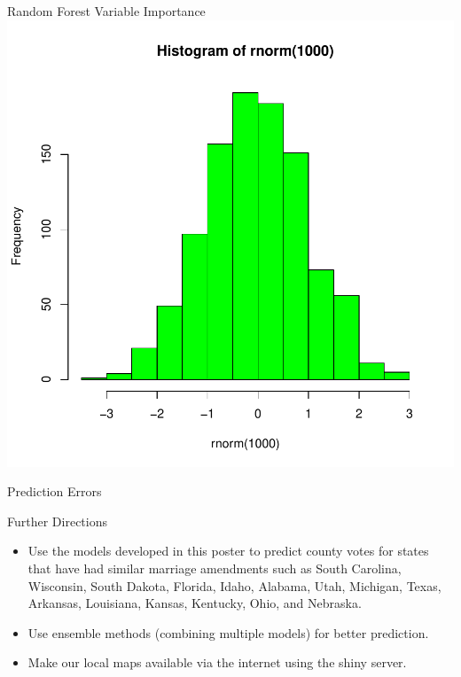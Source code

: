 \documentclass[final]{beamer}
\begin{document}
\begin{frame}[fragile]
\begin{columns}[t]
\begin{column}{0.31\linewidth}
\begin{minipage}[t][.955\textheight]{\linewidth}
\vspace{0ex}
\begin{block}{Random Forest Variable Importance}
\vspace{0ex}
\includegraphics{SummerBridge2-005}
\vspace{0ex}
\vfill
\end{block}
\vfill

\begin{block}{Prediction Errors}
\vspace{0ex}
\vfill
\end{block}
\vfill

\begin{block}{Further Directions}
\begin{itemize}
\item Use the models developed in this poster to predict county votes for states that have had similar marriage amendments such as South Carolina, Wisconsin, South Dakota, Florida, Idaho, Alabama, Utah, Michigan, Texas, Arkansas, Louisiana, Kansas, Kentucky, Ohio, and Nebraska. 
\item  Use ensemble methods (combining multiple models) for better prediction.
\item  Make our local maps available via the internet using the shiny server.
\end{itemize}
\vspace{0ex}
\vfill
\end{block}
\vfill


\end{minipage}
\end{column}
\end{columns}
\end{frame}
\end{document}
